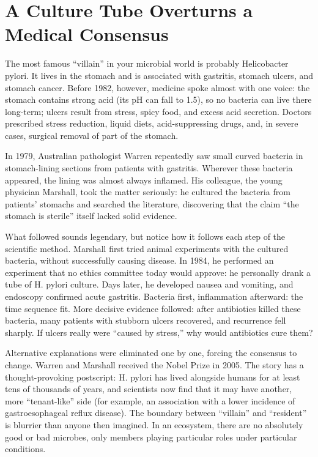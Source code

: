 \section{A Culture Tube Overturns a Medical Consensus}

\begin{zhengju}
The most famous ``villain'' in your microbial world is probably Helicobacter pylori. It lives in the stomach and is associated with gastritis, stomach ulcers, and stomach cancer. Before 1982, however, medicine spoke almost with one voice: the stomach contains strong acid (its pH can fall to 1.5), so no bacteria can live there long-term; ulcers result from stress, spicy food, and excess acid secretion. Doctors prescribed stress reduction, liquid diets, acid-suppressing drugs, and, in severe cases, surgical removal of part of the stomach.

In 1979, Australian pathologist Warren repeatedly saw small curved bacteria in stomach-lining sections from patients with gastritis. Wherever these bacteria appeared, the lining was almost always inflamed. His colleague, the young physician Marshall, took the matter seriously: he cultured the bacteria from patients' stomachs and searched the literature, discovering that the claim ``the stomach is sterile'' itself lacked solid evidence.

What followed sounds legendary, but notice how it follows each step of the scientific method. Marshall first tried animal experiments with the cultured bacteria, without successfully causing disease. In 1984, he performed an experiment that no ethics committee today would approve: he personally drank a tube of H. pylori culture. Days later, he developed nausea and vomiting, and endoscopy confirmed acute gastritis. Bacteria first, inflammation afterward: the time sequence fit. More decisive evidence followed: after antibiotics killed these bacteria, many patients with stubborn ulcers recovered, and recurrence fell sharply. If ulcers really were ``caused by stress,'' why would antibiotics cure them?

Alternative explanations were eliminated one by one, forcing the consensus to change. Warren and Marshall received the Nobel Prize in 2005. The story has a thought-provoking postscript: H. pylori has lived alongside humans for at least tens of thousands of years, and scientists now find that it may have another, more ``tenant-like'' side (for example, an association with a lower incidence of gastroesophageal reflux disease). The boundary between ``villain'' and ``resident'' is blurrier than anyone then imagined. In an ecosystem, there are no absolutely good or bad microbes, only members playing particular roles under particular conditions.
\end{zhengju}

